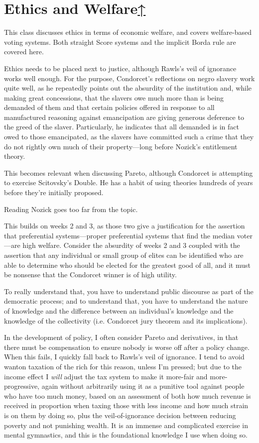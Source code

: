 \label{cur:ethics}
\section{Ethics and Welfare\hyperref[syllabus]{↑}}

This class discusses ethics in terms of economic welfare, and covers welfare-based voting systems.  Both straight Score systems and the implicit Borda rule are covered here.

Ethics needs to be placed next to justice, although Rawls's veil of ignorance works well enough.  For the purpose, Condorcet's reflections on negro slavery \autocite{Condorcet1781} work quite well, as he repeatedly points out the absurdity of the institution and, while making great concessions, that the slavers owe much more than is being demanded of them and that certain policies offered in response to all manufactured reasoning against emancipation are giving generous deference to the greed of the slaver.  Particularly, he indicates that all demanded is in fact owed to those emancipated, as the slavers have committed such a crime that they do not rightly own much of their property—long before Nozick's entitlement theory.

This becomes relevant when discussing Pareto, although Condorcet is attempting to exercise Scitovsky's Double.  He has a habit of using theories hundreds of years before they're initially proposed.

Reading Nozick goes too far from the topic.

This builds on weeks 2 and 3, as those two give a justification for the assertion that preferential systems—proper preferential systems that find the median voter—are high welfare.  Consider the absurdity of weeks 2 and 3 coupled with the assertion that any individual or small group of elites can be identified who are able to determine who should be elected for the greatest good of all, and it must be nonsense that the Condorcet winner is of high utility.

To really understand that, you have to understand public discourse as part of the democratic process; and to understand that, you have to understand the nature of knowledge and the difference between an individual's knowledge and the knowledge of the collectivity (i.e. Condorcet jury theorem and its implications).

In the development of policy, I often consider Pareto and derivatives, in that there must be compensation to ensure nobody is worse off after a policy change.  When this fails, I quickly fall back to Rawls's veil of ignorance.  I tend to avoid wanton taxation of the rich for this reason, unless I'm pressed; but due to the income effect I \textit{will} adjust the tax system to make it more-fair and more-progressive, again without arbitrarily using it as a punitive tool against people who have too much money, based on an assessment of both how much revenue is received in proportion when taxing those with less income and how much strain is on them by doing so, plus the veil-of-ignorance decision between reducing poverty and not punishing wealth.  It is an immense and complicated exercise in mental gymnastics, and this is the foundational knowledge I use when doing so.

